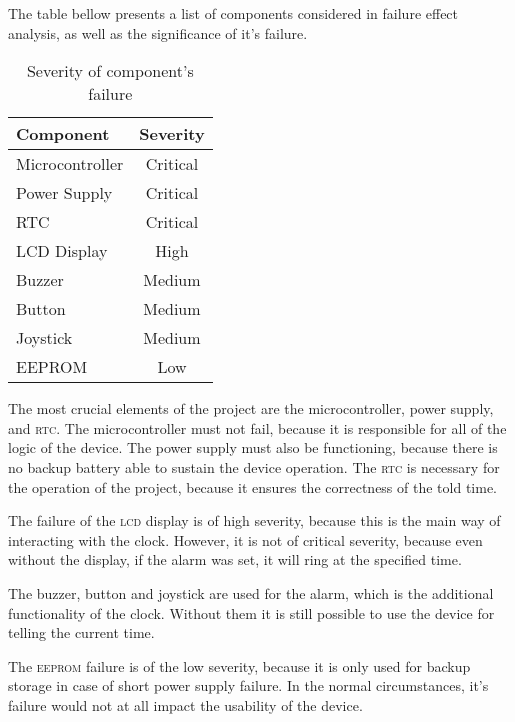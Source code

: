 \documentclass[10pt]{article}
\begin{document}
The table bellow presents a list of components considered in failure effect analysis, as well as the significance of it's failure.

\begin{table}[H]\centering
	\newcommand{\critical}{\color{red} Critical}
	\begin{tabular}{|l|c|}
		\hline
		\bf Component   & \bf Severity           \\\hline
		Microcontroller & \critical              \\\hline
		Power Supply    & \critical\footnotemark \\\hline
		RTC             & \critical              \\\hline
		LCD Display     & High                   \\\hline
		Buzzer          & Medium                 \\\hline
		Button          & Medium                 \\\hline
		Joystick        & Medium                 \\\hline
		EEPROM          & Low                    \\\hline
	\end{tabular}
	\caption{Severity of component's failure}
\end{table}

The most crucial elements of the project are the microcontroller, power supply, and \textsc{rtc}.
The microcontroller must not fail, because it is responsible for all of the logic of the device.
The power supply must also be functioning, because there is no backup battery able to sustain the device operation.
The \textsc{rtc} is necessary for the operation of the project, because it ensures the correctness of the told time.

The failure of the \textsc{lcd} display is of high severity, because this is the main way of interacting with the clock.
However, it is not of critical severity, because even without the display, if the alarm was set, it will ring at the specified time.

The buzzer, button and joystick are used for the alarm, which is the additional functionality of the clock.
Without them it is still possible to use the device for telling the current time.

The \textsc{eeprom} failure is of the low severity, because it is only used for backup storage in case of short power supply failure.
In the normal circumstances, it's failure would not at all impact the usability of the device.
\end{document}
